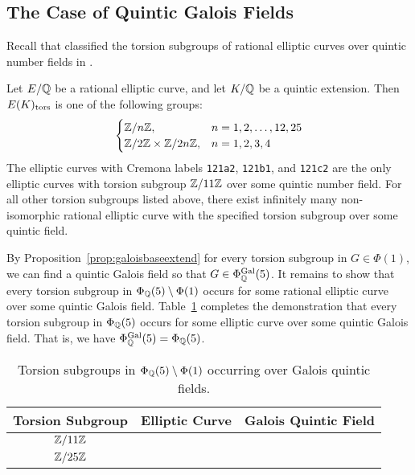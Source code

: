 \subsection{The Case of Quintic Galois Fields}

Recall that \gonjim{} classified the torsion subgroups of rational elliptic curves over quintic number fields in \cite{gonzalezjimenez17}.


\begin{thm}
Let $E/\mathbb{Q}$ be a rational elliptic curve, and let $K/\mathbb{Q}$ be a quintic extension. Then $E(K)_{\text{tors}}$ is one of the following groups:
	\[
	\begin{cases}
	\mathbb{Z}/n\mathbb{Z}, & n= 1,2 ,\ldots, 12, 25 \\
	\mathbb{Z}/2\mathbb{Z} \times \mathbb{Z}/2n\mathbb{Z}, & n= 1, 2, 3, 4
	\end{cases}
	\]
The elliptic curves with Cremona labels \texttt{121a2}, \texttt{121b1}, and \texttt{121c2} are the only elliptic curves with torsion subgroup $\mathbb{Z}/11\mathbb{Z}$ over some quintic number field. For all other torsion subgroups listed above, there exist infinitely many non-isomorphic rational elliptic curve with the specified torsion subgroup over some quintic field. 
\end{thm}	


By Proposition~\ref{prop:galoisbaseextend} for every torsion subgroup in $G \in \Phi(1)$, we can find a quintic Galois field so that $G \in \Phi_{\mathbb{Q}}^{\operatorname{Gal}}(5)$. It remains to show that every torsion subgroup in $\Phi_{\mathbb{Q}}(5) \setminus \Phi(1)$ occurs for some rational elliptic curve over some quintic Galois field. Table~\ref{tab:quinticgaloisoddex} completes the demonstration that every torsion subgroup in $\Phi_{\mathbb{Q}}(5)$ occurs for some elliptic curve over some quintic Galois field. That is, we have $\Phi_{\mathbb{Q}}^{\operatorname{Gal}}(5)= \Phi_{\mathbb{Q}}(5)$.


	\begin{table}[!ht]
	\centering
	\caption{Torsion subgroups in $\Phi_{\mathbb{Q}}(5) \setminus \Phi(1)$ occurring over Galois quintic fields.\label{tab:quinticgaloisoddex}}
	\begin{tabular}{ccc} \hline
	Torsion Subgroup & Elliptic Curve & Galois Quintic Field \\ \hline
	$\mathbb{Z}/11\mathbb{Z}$ & \otoct{} & \qzetaeep{} \\
	$\mathbb{Z}/25\mathbb{Z}$ & \eeat{} & \qzetaeep{}
	\end{tabular}
	\end{table}



